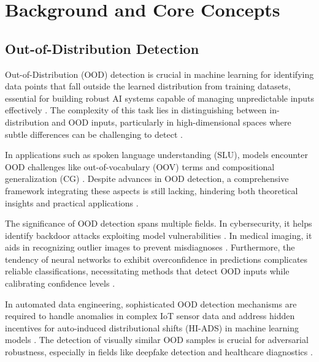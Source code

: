 \section{Background and Core Concepts} \label{sec:Background and Core Concepts}

\subsection{Out-of-Distribution Detection} \label{subsec:Out-of-Distribution Detection}

Out-of-Distribution (OOD) detection is crucial in machine learning for identifying data points that fall outside the learned distribution from training datasets, essential for building robust AI systems capable of managing unpredictable inputs effectively \cite{Out-of-Dis1}. The complexity of this task lies in distinguishing between in-distribution and OOD inputs, particularly in high-dimensional spaces where subtle differences can be challenging to detect \cite{zhao2021suodacceleratinglargescaleunsupervised}.

In applications such as spoken language understanding (SLU), models encounter OOD challenges like out-of-vocabulary (OOV) terms and compositional generalization (CG) \cite{porjazovski2024outofdistributiongeneralisationspokenlanguage}. Despite advances in OOD detection, a comprehensive framework integrating these aspects is still lacking, hindering both theoretical insights and practical applications \cite{wang2024bridgingooddetectiongeneralization}.

The significance of OOD detection spans multiple fields. In cybersecurity, it helps identify backdoor attacks exploiting model vulnerabilities \cite{pichler2024infeasibilitymlbackdoordetection}. In medical imaging, it aids in recognizing outlier images to prevent misdiagnoses \cite{islam2024outlierdetectionlargeradiological}. Furthermore, the tendency of neural networks to exhibit overconfidence in predictions complicates reliable classifications, necessitating methods that detect OOD inputs while calibrating confidence levels \cite{HowGoodAre3,li2021automateddataengineeringpipeline}.

In automated data engineering, sophisticated OOD detection mechanisms are required to handle anomalies in complex IoT sensor data \cite{li2019repairremovingrepresentationbias} and address hidden incentives for auto-induced distributional shifts (HI-ADS) in machine learning models \cite{krueger2020hiddenincentivesautoinduceddistributional}. The detection of visually similar OOD samples is crucial for adversarial robustness, especially in fields like deepfake detection and healthcare diagnostics \cite{Delvingint2,cao2021understandingsecuritydeepfakedetection,an2023intelligentdiagnosticschemelung}.

